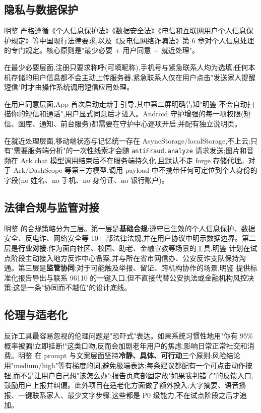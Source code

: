 \documentclass[UTF8,a4paper,12pt]{ctexart}
\begin{document}
\subsection{隐私与数据保护}

明鉴 严格遵循《个人信息保护法》《数据安全法》《电信和互联网用户个人信息保护规定》等中国现行法律要求,以及《反电信网络诈骗法》第 6 章对个人信息处理的专门规定。核心原则是"最少必要 + 用户同意 + 就近处理"。

在最少必要层面,注册只要求称呼(可填昵称),手机号与紧急联系人均为选填;任何本机存储的用户信息都不会主动上传服务器,紧急联系人仅在用户点击"发送家人提醒短信"时才由操作系统调用短信应用处理。

在用户同意层面,App 首次启动走新手引导,其中第二屏明确告知"明鉴 不会自动扫描你的短信和通话",用户显式同意后才进入。Android 守护增强的每一项权限(短信、图库、通知、前台服务)都需要在守护中心逐项开启,并配有独立说明页。

在就近处理层面,移动端状态与记忆统一存在 AsyncStorage/localStorage,不上云;只有"需要服务端分析"的一次性线索才会随 \texttt{antiFraud.analyze} 请求发送;图片和音频在 Ark chat 模型调用结束后不在服务端持久化,且默认不走 forge 存储代理。对于 Ark/DashScope 等第三方模型,调用 payload 中不携带任何可定位到个人身份的字段(no 姓名、no 手机、no 身份证、no 银行账户)。

\subsection{法律合规与监管对接}

明鉴 的合规策略分为三层。第一层是\textbf{基础合规}:遵守已生效的个人信息保护、数据安全、反电诈、网络安全等 10+ 部法律法规,并在用户协议中明示数据边界。第二层是\textbf{行业对接}:作为面向社区、校园、助老、金融宣教等场景的工具,明鉴 计划在试点阶段主动接入地方反诈中心备案,并与所在省市网信办、公安反诈支队保持沟通。第三层是\textbf{监管协同}:对于可能触及举报、留证、跨机构协作的场景,明鉴 提供标准化报告导出与联系 96110 的一键入口,但不直接代替公安执法或金融机构风控决策;这是一条"协同而不越位"的设计底线。

\subsection{伦理与适老化}

反诈工具最容易忽视的伦理问题是"恐吓式"表达。如果系统习惯性地用"你有 95\% 概率被骗!立即挂断!"这类口吻,反而会加剧老年用户的焦虑,影响日常正常社交和消费。明鉴 在 prompt 与文案层面坚持\textbf{冷静、具体、可行动}三个原则:风险结论用"medium/high"等有梯度的词,避免极端表达;每条建议都配有一个可点击动作按钮,而不是让用户自己想"该怎么办";报告页底部固定放"如果我判错了"的反馈入口,鼓励用户上报并纠偏。此外项目在适老化方面做了额外投入:大字摘要、语音播报、一键联系家人、最少文字步骤,这些都是 P0 级能力,不在试点阶段之后才追加。
\end{document}
